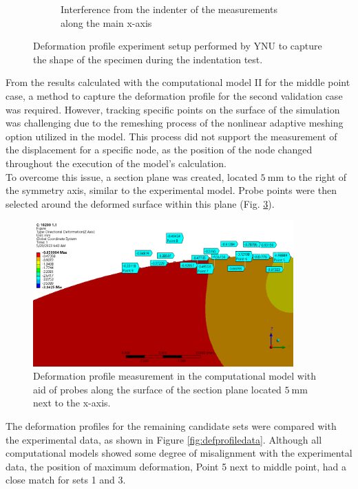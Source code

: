 \begin{figure}
\begin{subfigure}[b]{0.5\textwidth}
    \caption{Interference from the indenter of the measurements along the main x-axis}
    \label{fig:defprofinter}
    \end{subfigure}
    \hspace{0.3cm}
    \caption[Deformation profile experiment]{Deformation profile experiment setup performed by YNU to capture the shape of the specimen during the indentation test.}
    \label{fig:defprofexperiment}
\end{figure}

From the results calculated with the computational model II for the middle point case, 
a method to capture the deformation profile for the second validation case was required.
However, tracking specific points on the surface of the simulation was challenging due to 
the remeshing process of the nonlinear adaptive meshing option utilized in the model. This
process did not support the measurement of the displacement for a specific node, as the 
position of the node changed throughout the execution of the model's calculation.\\

To overcome this issue, a section plane was created, located $\SI{5}{\milli \meter}$ to the 
right of the symmetry axis, similar to the experimental model. Probe points were then
selected around the deformed surface within this plane (Fig. \ref{fig:defprofcompmodel}).

\begin{figure}%
	\centering
   \quad
   \includegraphics[width=10cm]{Images/validationcase/defprof/10200defprofile.png}%
   \caption[Deformation profile - Computational model]{Deformation profile measurement in the computational model with aid of probes along the surface of the section plane located $\SI{5}{\milli \meter}$ next to the x-axis.}%
   \label{fig:defprofcompmodel}%
\end{figure}

The deformation profiles for the remaining candidate sets were compared with the experimental
data, as shown in Figure \ref{fig:defprofiledata}. Although all computational models 
showed some degree of misalignment with the experimental data, the position of maximum deformation,
Point \SI{5}{} next to middle point, had a close match for sets \SI{1}{} and \SI{3}{}.

